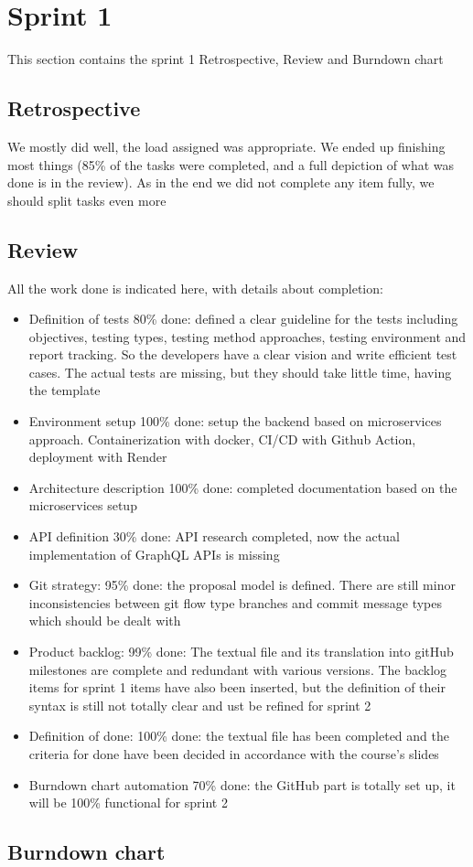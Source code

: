 \section{Sprint 1} \label{sprint_1}

This section contains the sprint 1 Retrospective, Review and Burndown chart

\subsection{Retrospective}
We mostly did well, the load assigned was appropriate. We ended up finishing most things (85\% of the tasks were completed, and a full depiction of what was done is in the review). As in the end we did not complete any item fully, we should split tasks even more


\subsection{Review}
All the work done is indicated here, with details about completion:
\begin{itemize}
	\item Definition of tests 80\% done: defined a clear guideline for the tests including objectives, testing types, testing method approaches, testing environment and report tracking. So the developers have a clear vision and write efficient test cases. The actual tests are missing, but they should take little time, having the template
	\item Environment setup 100\% done: setup the backend based on microservices approach. Containerization with docker, CI/CD with Github Action, deployment with Render
	\item Architecture description 100\% done: completed documentation based on the microservices setup
	\item API definition 30\% done: API research completed, now the actual implementation of GraphQL APIs is missing
	\item Git strategy: 95\% done: the proposal model is defined. There are still minor inconsistencies between git flow type branches and commit message types which should be dealt with
	\item Product backlog: 99\% done: The textual file and its translation into gitHub milestones are complete and redundant with various versions. The backlog items for sprint 1 items have also been inserted, but the definition of their syntax is still not totally clear and ust be refined for sprint 2
	\item Definition of done: 100\% done: the textual file has been completed and the criteria for done have been decided in accordance with the course’s slides
	\item Burndown chart automation 70\% done: the GitHub part is totally set up, it will be 100\% functional for sprint 2
\end{itemize}

\subsection{Burndown chart}
